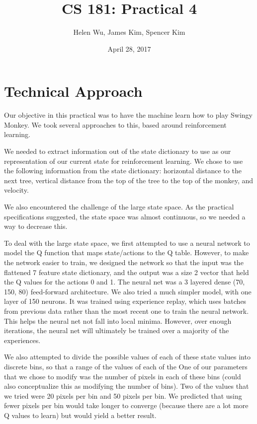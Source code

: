 \documentclass[11pt]{article}
\title{CS 181: Practical 4}
\author{Helen Wu, James Kim, Spencer Kim}
\date{April 28, 2017}
\begin{document}
\maketitle

\section{Technical Approach}

Our objective in this practical was to have the machine learn how to play Swingy Monkey. We took several approaches to this, based around reinforcement learning. 

We needed to extract information out of the state dictionary to use as our representation of our current state for reinforcement learning. We chose to use the following information from the state dictionary: horizontal distance to the next tree, vertical distance from the top of the tree to the top of the monkey, and velocity. 

We also encountered the challenge of the large state space. As the practical specifications suggested, the state space was almost continuous, so we needed a way to decrease this. 

To deal with the large state space, we first attempted to use a neural network to model the Q function that maps state/actions to the Q table. However, to make the network easier to train, we designed the network so that the input was the flattened 7 feature state dictionary, and the output was a size 2 vector that held the Q values for the actions 0 and 1. The neural net was a 3 layered dense (70, 150, 80) feed-forward architecture. We also tried a much simpler model, with one layer of 150 neurons. It was trained using experience replay, which uses batches from previous data rather than the most recent one to train the neural network. This helps the neural net not fall into local minima. However, over enough iterations, the neural net will ultimately be trained over a majority of the experiences.

We also attempted to divide the possible values of each of these state values into discrete bins, so that a range of the values of each of the  One of our parameters that we chose to modify was the number of pixels in each of these bins (could also conceptualize this as modifying the number of bins). Two of the values that we tried were 20 pixels per bin and 50 pixels per bin. We predicted that using fewer pixels per bin would take longer to converge (because there are a lot more Q values to learn) but would yield a better result.
\end{document}
